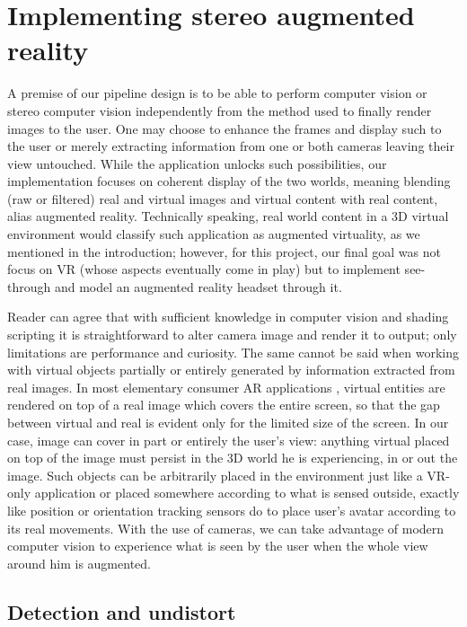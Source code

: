 \section{Implementing stereo augmented reality}
A premise of our pipeline design is to be able to perform computer vision or stereo computer vision independently from the method used to finally render images to the user. One may choose to enhance the frames and display such to the user or merely extracting information from one or both cameras leaving their view untouched. While the application unlocks such possibilities, our implementation focuses on coherent display of the two worlds, meaning blending (raw or filtered) real and virtual images and virtual content with real content, alias augmented reality. Technically speaking, real world content in a 3D virtual environment would classify such application as augmented virtuality, as we mentioned in the introduction; however, for this project, our final goal was not focus on VR (whose aspects eventually come in play) but to implement see-through and model an augmented reality headset through it.

Reader can agree that with sufficient knowledge in computer vision and shading scripting it is straightforward to alter camera image and render it to output; only limitations are performance and curiosity. The same cannot be said when working with virtual objects partially or entirely generated by information extracted from real images. In most elementary consumer AR applications \cite{link_google_translate_AR} \cite{link_IKEA_AR}, virtual entities are rendered on top of a real image which covers the entire screen, so that the gap between virtual and real is evident only for the limited size of the screen. In our case, image can cover in part or entirely the user's view: anything virtual placed on top of the image must persist in the 3D world he is experiencing, in or out the image. Such objects can be arbitrarily placed in the environment just like a VR-only application or placed somewhere according to what is sensed outside, exactly like position or orientation tracking sensors do to place user's avatar according to its real movements. With the use of cameras, we can take advantage of modern computer vision to experience what is seen by the user when the whole view around him is augmented.

\subsection{Detection and undistort}

